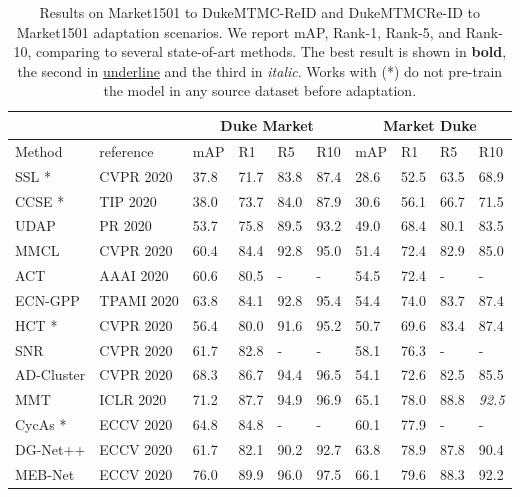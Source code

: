 \documentclass[journal]{IEEEtran}
\begin{document}
\begin{table*}[!ht]
\caption{Results on Market1501 to DukeMTMC-ReID and DukeMTMCRe-ID to Market1501 adaptation scenarios. We report mAP, Rank-1, Rank-5, and Rank-10, comparing to several state-of-art methods. The best result is shown in \textbf{bold}, the second in \underline{underline} and the third in \textit{italic}. Works with (*) do not pre-train the model in any source dataset before adaptation.}
\label{tab:MarketAndDuke}
\centering
\begin{tabular}{|p{2.7cm}| p{2.0cm}|p{0.8cm}|p{1.0cm}|p{1.0cm}|p{1.0cm}|p{0.8cm}|p{1.0cm}|p{1.0cm}|p{1.0cm}|}
\hline
\multicolumn{1}{|c|}{} &
\multicolumn{1}{|c|}{} &
\multicolumn{4}{|c|}{Duke  Market} & \multicolumn{4}{|c|}{Market  Duke} \\
\hline
Method & reference & mAP & R1 & R5 & R10
& mAP & R1 & R5 & R10 \\ \hline
SSL \cite{lin2020unsupervised}* & CVPR 2020 & 37.8 & 71.7 & 83.8 & 87.4 & 28.6 & 52.5 & 63.5 & 68.9 \\
CCSE \cite{lin2020unsupervisedccse}* & TIP 2020 & 38.0 & 73.7 & 84.0 & 87.9 & 30.6 & 56.1 & 66.7 & 71.5 \\
UDAP \cite{song2020unsupervised} & PR 2020 & 53.7 & 75.8 & 89.5 & 93.2 & 49.0 & 68.4 & 80.1 & 83.5 \\
MMCL \cite{wang2020unsupervised}& CVPR 2020 & 60.4 & 84.4 & 92.8 & 95.0 & 51.4 & 72.4 & 82.9 & 85.0 \\
ACT \cite{yang2020asymmetric} & AAAI 2020 & 60.6 & 80.5 & - & - & 54.5 & 72.4 & - & - \\
ECN-GPP \cite{zhong2020learning} & TPAMI 2020 & 63.8 & 84.1 & 92.8 & 95.4 & 54.4 & 74.0 & 83.7 & 87.4 \\
HCT \cite{zeng2020hierarchical}* & CVPR 2020 & 56.4 & 80.0 & 91.6 & 95.2 & 50.7 & 69.6 & 83.4 & 87.4 \\ 
SNR \cite{jin2020style} & CVPR 2020 & 61.7 & 82.8 & - & - & 58.1 & 76.3 & - & - \\
AD-Cluster \cite{zhai2020ad} & CVPR 2020 & 68.3 & 86.7 & 94.4 & 96.5 & 54.1 & 72.6 & 82.5 & 85.5 \\
MMT \cite{ge2020mutual} & ICLR 2020 & 71.2 & 87.7 & 94.9 & 96.9 & 65.1 & 78.0 & 88.8 & \textit{92.5} \\
CycAs \cite{wang2020cycas}* & ECCV 2020 & 64.8 & 84.8 & - & - & 60.1 & 77.9 & - & - \\
DG-Net++ \cite{zou2020joint} & ECCV 2020 & 61.7 & 82.1 & 90.2 & 92.7 & 63.8 & 78.9 & 87.8 & 90.4 \\
MEB-Net \cite{zhai2020multiple} & ECCV 2020 & 76.0 & 89.9 & 96.0 & 97.5 & 66.1 & 79.6 & 88.3 & 92.2 \\

\end{tabular}
\end{table*}
\end{document}
